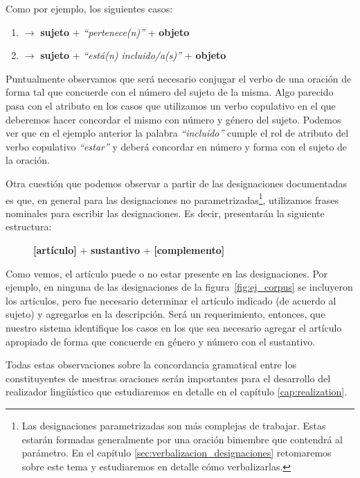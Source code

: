 \noindent
Como por ejemplo, los siguientes casos:

\bigskip
\begin{enumerate}
 \item {} $\rightarrow$ \textbf{sujeto} + \emph{``pertenece(n)''} + \textbf{objeto}
 \item {} $\rightarrow$ \textbf{sujeto} + \emph{``está(n) incluido/a(s)''} + \textbf{objeto}
\end{enumerate}

\bigskip
Puntualmente observamos que será necesario conjugar el verbo de una oración de forma tal que concuerde con el número del sujeto de la misma. Algo parecido pasa con el atributo en los casos que utilizamos un verbo copulativo en el que deberemos hacer concordar el mismo con número y género del sujeto. Podemos ver que en el ejemplo anterior la palabra \emph{``incluido''} cumple el rol de atributo del verbo copulativo \emph{``estar''} y deberá concordar en número y forma con el sujeto de la oración. 


Otra cuestión que podemos observar a partir de las designaciones documentadas es que, en general para las designaciones no parametrizadas\footnote{Las designaciones parametrizadas son más complejas de trabajar. Estas estarán formadas generalmente por una oración bimembre que contendrá al parámetro. En el capítulo \ref{sec:verbalizacion_designaciones} retomaremos sobre este tema y estudiaremos en detalle cómo verbalizarlas.}, utilizamos frases nominales para escribir las designaciones. Es decir, presentarán la siguiente estructura:

\begin{figure}[H]
\center
\textbf{[artículo]} + \textbf{sustantivo} + \textbf{[complemento]}
\end{figure}

Como vemos, el artículo puede o no estar presente en las designaciones. Por ejemplo, en ninguna de las designaciones de la figura~\ref{fig:ej_corpus} se incluyeron los artículos, pero fue necesario determinar el artículo indicado (de acuerdo al sujeto) y agregarlos en la descripción. Será un requerimiento, entonces, que nuestro sistema identifique los casos en los que sea necesario agregar el artículo apropiado de forma que concuerde en género y número con el sustantivo. 

Todas estas observaciones sobre la concordancia gramatical entre los constituyentes de nuestras oraciones serán importantes para el desarrollo del realizador lingüístico que estudiaremos en detalle en el capítulo \ref{cap:realization}.

